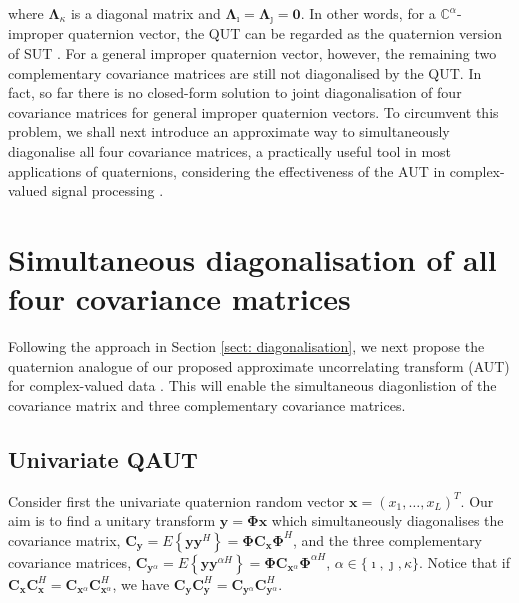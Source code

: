 \documentclass[review]{elsarticle}
\theoremstyle{plain}
\theoremstyle{remark}
\theoremstyle{plain}
\theoremstyle{definition}
\theoremstyle{prop}
\theoremstyle{definition}
\theoremstyle{plain}
\theoremstyle{plain}
\begin{document}
\noindent where $\mathbf{\Lambda}_\kappa$ is a diagonal matrix and $\mathbf{\Lambda}_\imath=\mathbf{\Lambda}_\jmath=\mathbf{0}$. In other words, for a $\mathbb{C}^\alpha$-improper quaternion vector, the QUT can be regarded as the quaternion version of SUT \cite{de2002,Eriksson2006}. For a general improper quaternion vector, however, the remaining two complementary covariance matrices are still not diagonalised by the QUT. In fact, so far there is no closed-form solution to joint diagonalisation of four covariance matrices for general improper quaternion vectors. To circumvent this problem, we shall next introduce an approximate way to simultaneously diagonalise all four covariance matrices, a practically useful tool in most applications of quaternions, considering the effectiveness of the AUT in complex-valued signal processing \cite{mandic2015mean,xia2017complementary,xia2017full}.

\section{Simultaneous diagonalisation of all four covariance matrices}\label{sect:QAUT}
Following the approach in Section \ref{sect: diagonalisation}, we next propose the quaternion analogue of our proposed approximate uncorrelating transform (AUT) for complex-valued data \cite{CheongTook2012}. This will enable the simultaneous diagonlistion of the covariance matrix and three complementary covariance matrices.
\subsection{Univariate QAUT}
Consider first the univariate quaternion random vector $\mathbf{x}=\left(x_1, \ldots, x_L\right)^T$. Our aim is to find a unitary transform
$\mathbf{y}=\mathbf{\Phi}\mathbf{x}$ which simultaneously diagonalises the covariance matrix, $\mathbf{C}_{\mathbf{y}}=E\left\{ \mathbf{y}\mathbf{y}^{H}\right\}=\mathbf{\Phi}\mathbf{C}_{\mathbf{x}}\mathbf{\Phi}^H$, and the three complementary covariance matrices, $\mathbf{C}_{\mathbf{y}^\alpha}=E\left\{ \mathbf{y}\mathbf{y}^{\alpha H}\right\}=\mathbf{\Phi}\mathbf{C}_{\mathbf{x}^\alpha}\mathbf{\Phi}^{\alpha H}$, $\alpha \in \{\imath,\jmath,\kappa\}$.
Notice that if $\mathbf{C}_{\mathbf{x}}\mathbf{C}_{\mathbf{x}}^H=\mathbf{C}_{\mathbf{x}^\alpha}\mathbf{C}_{\mathbf{x}^\alpha}^H$, we have $\mathbf{C}_{\mathbf{y}}\mathbf{C}_{\mathbf{y}}^H=\mathbf{C}_{\mathbf{y}^\alpha}\mathbf{C}_{\mathbf{y}^\alpha}^H$.
\end{document}
